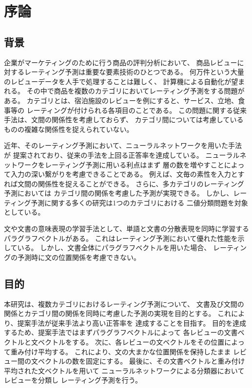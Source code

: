 \section{序論} \label{sec:Introduction}

\subsection{背景}

企業がマーケティングのために行う商品の評判分析において、
商品レビューに対するレーティング予測は重要な要素技術のひとつである。
何万件という大量のレビューデータを人手で処理することは難しく、
計算機による自動化が望まれる。
その中で商品を複数のカテゴリにおいてレーティング予測をする問題がある。
カテゴリとは、宿泊施設のレビューを例にすると、サービス、立地、食事等の
レーティングが付けられる各項目のことである。
この問題に関する従来手法\cite{fujitani15}は、文間の関係性を考慮しておらず、
カテゴリ間については考慮しているものの複雑な関係性を捉えられていない。

近年、そのレーティング予測において、ニューラルネットワークを用いた手法
\cite{nal14,rie14,duyu15}が
提案されており、従来の手法を上回る正答率を達成している。
ニューラルネットワークをレーティング予測に用いる利点はまず
層の数を増やすことによって入力の深い繋がりを考慮できることである。
例えば、文毎の素性を入力とすれば文間の関係性を捉えることができる。
さらに、多カテゴリのレーティング予測においては
カテゴリ間の関係を考慮した予測が実現できる。
しかし、レーティング予測に関する多くの研究は1つのカテゴリにおける
二値分類問題を対象としている。

文や文書の意味表現の学習手法として、単語と文書の分散表現を同時に学習する
パラグラフベクトル\cite{quoc14}がある。
これはレーティング予測において優れた性能を示している。
しかし、文書全体にパラグラフベクトルを用いた場合、
レーティングの予測時に文の位置関係を考慮できない。


\subsection{目的}

本研究は、複数カテゴリにおけるレーティング予測について、
文書及び文間の関係とカテゴリ間の関係を同時に考慮した予測の実現を目的とする。
これにより、提案手法が従来手法\cite{fujitani15}より高い正答率を
達成することを目指す。
目的を達成するため、提案手法ではまずパラグラフベクトル\cite{quoc14}によって
各レビューの文書ベクトルと文ベクトルをする。
次に、各レビューの文ベクトルをその位置によって重み付け平均する。
これにより、文の大まかな位置関係を保持したまま
レビュー間の文ベクトルの数を固定にする。
最後に、その文書ベクトルと重み付け平均された文ベクトルを用いて
ニューラルネットワークによる分類器においてレビューを分類し
レーティング予測を行う。



